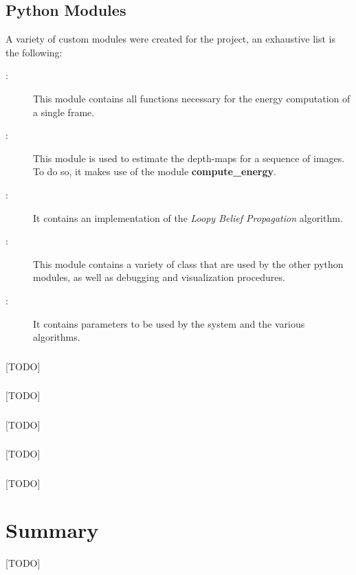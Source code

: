 \documentclass[notitlepage,english]{hgbreport}
\begin{document}
\section{Python Modules}
A variety of custom modules were created for the project, an exhaustive list is the following:
\begin{description}
	\item[\ComputeEnergy:] This module contains all functions necessary for the energy computation of a single frame.
	\item[\Estimate:] This module is used to estimate the depth-maps for a sequence of images. To do so, it makes use of the module \textbf{compute\_energy}.
	\item[\Lbp:] It contains an implementation of the \emph{Loopy Belief Propagation} algorithm.
	\item[\Utils:] This module contains a variety of class that are used by the other python modules, as well as debugging and visualization procedures.
	\item[\Params:] It contains parameters to be used by the system and the various algorithms.
\end{description}

\subsection{\ComputeEnergy}
[TODO]
\subsection{\Estimate}
[TODO]
\subsection{\Lbp}
[TODO]
\subsection{\Utils}
[TODO]
\subsection{\Params}
[TODO]






\chapter{Summary}
[TODO]
\end{document}
